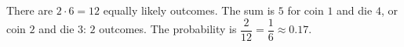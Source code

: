 There are $2\cdot6=12$ equally likely outcomes. The sum is $5$ for coin $1$ and die $4$, or coin $2$ and die $3$: $2$ outcomes. The probability is $\dfrac{2}{12}=\dfrac16\approx\boxed{0.17}$.
